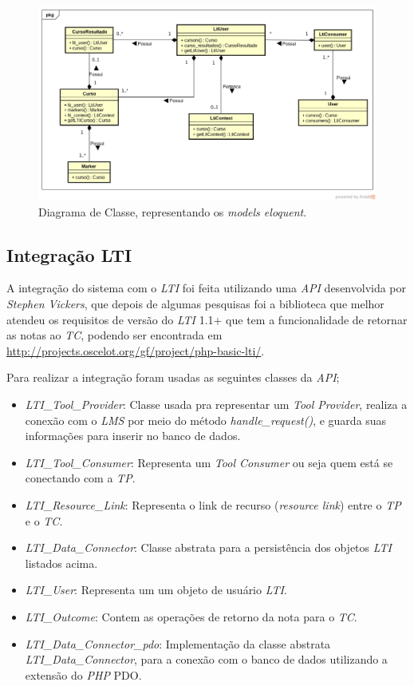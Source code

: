 \begin{figure}[htpb]
  \centering
  \includegraphics[width=1.0\linewidth]{figuras/diagrama_classe_eloquent.png}
  \caption{Diagrama de Classe, representando os \textit{models eloquent}.}
  \label{fig:diagrama_classe_eloquent}
\end{figure}

\subsection{Integração LTI}
\label{sec:integracao}

A integração do sistema com o \textit{LTI} foi feita utilizando uma \textit{API} desenvolvida por \textit{Stephen Vickers}, que depois de algumas pesquisas foi a biblioteca que melhor atendeu os requisitos de versão do \textit{LTI} 1.1+ que tem a funcionalidade de retornar as notas ao \textit{TC}, podendo ser encontrada em \url{http://projects.oscelot.org/gf/project/php-basic-lti/}.

Para realizar a integração foram usadas as seguintes classes da \textit{API};

\begin{itemize}
    \item \textit{LTI\_Tool\_Provider}: Classe usada pra representar um \textit{Tool Provider}, realiza a conexão com o \textit{LMS} por meio do método \textit{handle\_request()}, e guarda suas informações para inserir no banco de dados.
    \item \textit{LTI\_Tool\_Consumer}: Representa um \textit{Tool Consumer} ou seja quem está se conectando com a \textit{TP}.
    \item \textit{LTI\_Resource\_Link}: Representa o link de recurso (\textit{resource link}) entre o \textit{TP} e o \textit{TC}.
    \item \textit{LTI\_Data\_Connector}: Classe abstrata para a persistência dos objetos \textit{LTI} listados acima.
    \item \textit{LTI\_User}: Representa um um objeto de usuário \textit{LTI}.
    \item \textit{LTI\_Outcome}: Contem as operações de retorno da nota para o \textit{TC}.
    \item \textit{LTI\_Data\_Connector\_pdo}: Implementação da classe abstrata \textit{LTI\_Data\_Connector}, para a conexão com o banco de dados utilizando a extensão do \textit{PHP} \ac{PDO}.
\end{itemize}

